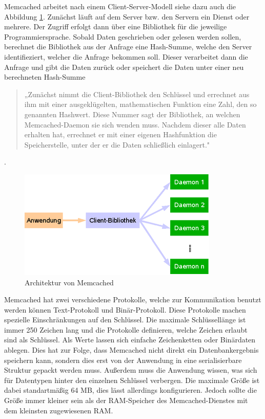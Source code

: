 Memcached arbeitet nach einem Client-Server-Modell siehe dazu auch die
Abbildung \ref{fig:memcached-architecture}. Zunächst läuft auf dem
Server bzw. den Servern ein Dienst oder mehrere. Der Zugriff erfolgt dann über
eine Bibliothek für die jeweilige Programmiersprache. Sobald Daten geschrieben
oder gelesen werden sollen, berechnet die Bibliothek aus der Anfrage eine
Hash-Summe, welche den Server identifieziert, welcher die Anfrage bekommen
soll. Dieser verarbeitet dann die Anfrage und gibt die Daten zurück oder
speichert die Daten unter einer neu berechneten Hash-Summe

\begin{quote}
    „Zunächst nimmt die Client-Bibliothek den Schlüssel und errechnet aus ihm
    mit einer ausgeklügelten, mathematischen Funktion eine Zahl, den so
    genannten Hashwert. Diese Nummer sagt der Bibliothek, an welchen
    Memcached-Daemon sie sich wenden muss. Nachdem dieser alle Daten erhalten
    hat, errechnet er mit einer eigenen Hashfunktion die Speicherstelle, unter
    der er die Daten schließlich einlagert." \cite{Schuermann2009}
\end{quote}
.

\begin{figure}
\centering
\includegraphics{images/memcached_illustration_large.png}
\caption{Architektur von Memcached \cite{Schuermann2009}}
\label{fig:memcached-architecture}
\end{figure}

Memcached hat zwei verschiedene Protokolle, welche zur Kommunikation benutzt
werden können Text-Protokoll und Binär-Protokoll. Diese Protokolle machen
spezielle Einschränkungen auf den Schlüssel. Die maximale Schlüssellänge ist
immer 250 Zeichen lang und die Protokolle definieren, welche Zeichen erlaubt
sind als Schlüssel. Als Werte lassen sich einfache Zeichenketten oder
Binärdaten ablegen. Dies hat zur Folge, dass Memcached nicht direkt ein
Datenbankergebnis speichern kann, sondern dies erst von der Anwendung in eine
serialisierbare Struktur gepackt werden muss. Außerdem muss die Anwendung
wissen, was sich für Datentypen hinter den einzelnen Schlüssel verbergen.
Die maximale Größe ist dabei standartmäßig 64 MB, dies lässt allerdings
konfigurieren. Jedoch sollte die Größe immer kleiner sein als
der \gls{RAM}-Speicher des Memcached-Dienstes mit dem kleinsten
zugewiesenen \gls{RAM}.

